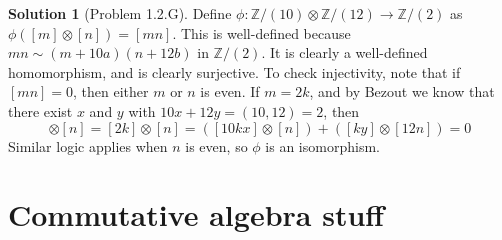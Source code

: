 \documentclass[aps,pra,showpacs,notitlepage,onecolumn,superscriptaddress,nofootinbib]{revtex4-1}
\theoremstyle{definition}
\newtheorem{solution}{Solution}[section]
\begin{document}
\begin{solution}[Problem 1.2.G]
  Define $\phi : \mathbb{Z}/(10) \otimes \mathbb{Z}/(12) \rightarrow \mathbb{Z}/(2)$ as $\phi([m] \otimes [n]) = [mn]$. This is well-defined because $mn \sim (m + 10a) (n + 12b)$ in $\mathbb{Z}/(2)$.
  It is clearly a well-defined homomorphism, and is clearly surjective. To check injectivity, note that if $[mn] = 0$, then either $m$ or $n$ is even. If $m = 2k$, and by Bezout we know that there
  exist $x$ and $y$ with $10x + 12y = (10, 12) = 2$, then
  \begin{equation}
    [m] \otimes [n] = [2k] \otimes [n] = ([10kx] \otimes [n]) + ([ky] \otimes [12n]) = 0
    \end{equation}
  Similar logic applies when $n$ is even, so $\phi$ is an isomorphism.
  \end{solution}

\section{Commutative algebra stuff}
\end{document}
